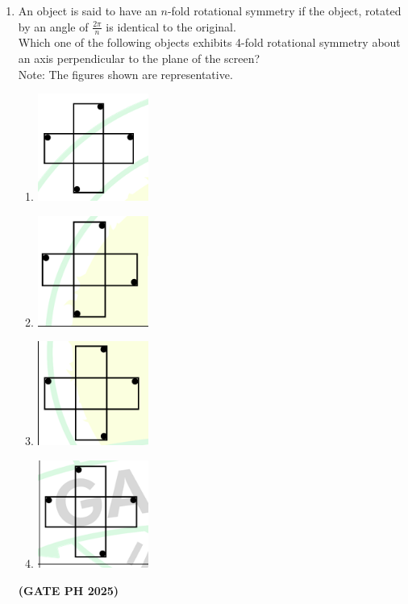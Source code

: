 \documentclass[14pt, a4paper]{extarticle}
\begin{document}
\begin{enumerate}[label=\textbf{Q.\arabic*}]
\item An object is said to have an $n$-fold rotational symmetry if the object, rotated by an angle of $\frac{2\pi}{n}$ is identical to the original. \\
Which one of the following objects exhibits 4-fold rotational symmetry about an axis perpendicular to the plane of the screen? \\
Note: The figures shown are representative.
\begin{enumerate}
\item \includegraphics[width=0.3\textwidth]{figs/q10figa25.png}
\item \includegraphics[width=0.3\textwidth]{figs/q10figb25.png}
\item \includegraphics[width=0.3\textwidth]{figs/q10figc25.png}
\item \includegraphics[width=0.3\textwidth]{figs/q10figd25.png}
\end{enumerate}
\hfill \textbf{(GATE PH 2025)}

\end{enumerate}
\end{document}
